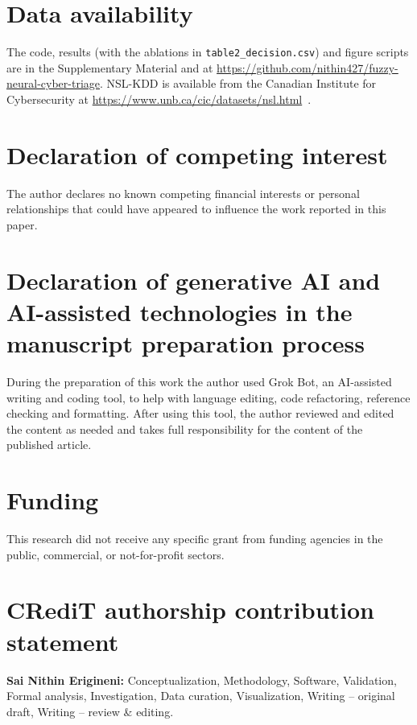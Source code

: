 \documentclass[preprint,12pt]{elsarticle}
\begin{document}
\section*{Data availability}
The code, results (with the ablations in \texttt{table2\_decision.csv}) and figure scripts are in the Supplementary Material and at \url{https://github.com/nithin427/fuzzy-neural-cyber-triage}. NSL-KDD is available from the Canadian Institute for Cybersecurity at \url{https://www.unb.ca/cic/datasets/nsl.html}~\cite{tavallaee2009}.

\section*{Declaration of competing interest}
The author declares no known competing financial interests or personal relationships that could have appeared to influence the work reported in this paper.

\section*{Declaration of generative AI and AI-assisted technologies in the manuscript preparation process}
During the preparation of this work the author used Grok Bot, an AI-assisted writing and coding tool, to help with language editing, code refactoring, reference checking and formatting. After using this tool, the author reviewed and edited the content as needed and takes full responsibility for the content of the published article.

\section*{Funding}
This research did not receive any specific grant from funding agencies in the public, commercial, or not-for-profit sectors.

\section*{CRediT authorship contribution statement}
\textbf{Sai Nithin Erigineni:} Conceptualization, Methodology, Software, Validation, Formal analysis, Investigation, Data curation, Visualization, Writing -- original draft, Writing -- review \& editing.

\renewcommand{\bibfont}{\fontsize{8.5}{9.5}\selectfont}\setlength{\bibsep}{0pt plus 0.5pt}


\end{document}
